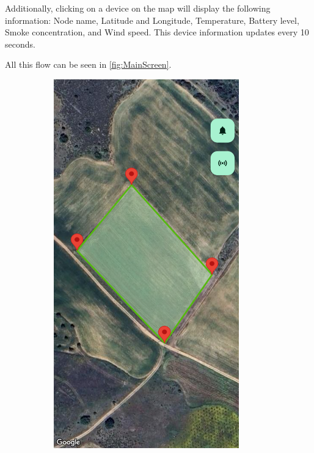 \begin{enumerate}
    Additionally, clicking on a device on the map will display the following information: Node name, 
    Latitude and Longitude, Temperature, Battery level, Smoke concentration, and Wind speed. 
    This device information updates every 10 seconds.

    All this flow can be seen in \autoref{fig:MainScreen}.

        \begin{figure}[H]
            \centering
            \begin{subfigure}[t]{0.4\textwidth}
                \centering
                \includegraphics[width=0.882\textwidth]{images/8/04.png}

\end{subfigure}
\end{figure}
\end{enumerate}
